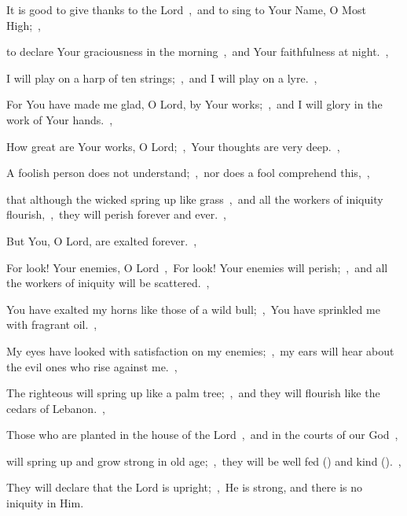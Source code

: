 \documentclass[12pt,twoside,a5paper]{article}
\begin{document}
\begin{normalparskip}
  It is good to give thanks to the Lord~\sep\ and to sing to Your Name, O Most High;~\sep


  to declare Your graciousness in the morning~\sep\ and Your faithfulness at night.~\sep

  I will play on a harp of ten strings;~\sep\ and I will play on a lyre.~\sep

  For You have made me glad, O Lord, by Your works;~\sep\ and I will glory in the work of Your hands.~\sep

  How great are Your works, O Lord;~\sep\ Your thoughts are very deep.~\sep

  A foolish person does not understand;~\sep\ nor does a fool comprehend this,~\sep

  that although the wicked spring up like grass~\sep\ and all the workers of iniquity flourish,~\sep\ they will perish forever and ever.~\sep

  But You, O Lord, are exalted forever.~\sep

  For look! Your enemies, O Lord~\sep\ For look! Your enemies will perish;~\sep\ and all the workers of iniquity will be scattered.~\sep

  You have exalted my horns like those of a wild bull;~\sep\ You have sprinkled me with fragrant oil.~\sep

  My eyes have looked with satisfaction on my enemies;~\sep\ my ears will hear about the evil ones who rise against me.~\sep

  The righteous will spring up like a palm tree;~\sep\ and they will flourish like the cedars of Lebanon.~\sep

  Those who are planted in the house of the Lord~\sep\ and in the courts of our God~\sep

  will spring up and grow strong in old age;~\sep\ they will be well fed () and kind ().~\sep

  They will declare that the Lord is upright;~\sep\ He is strong, and there is no iniquity in Him.
\end{normalparskip}



\end{document}
